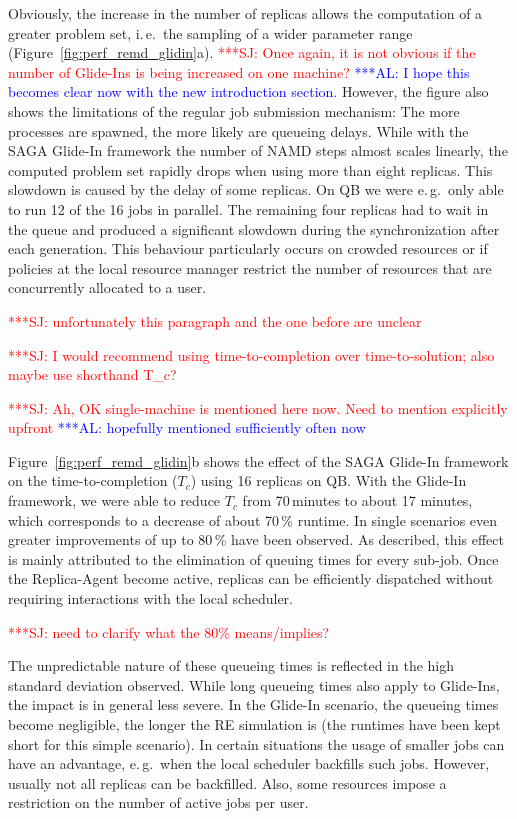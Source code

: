 \documentclass{rspublic}
\newcommand{\alnote}[1]{ {\textcolor{blue} { ***AL: #1 }}}
\newcommand{\jhanote}[1]{ {\textcolor{red} { ***SJ: #1 }}}
\newcommand{\alnote}[1]{}
\newcommand{\jhanote}[1]{}
\begin{document}
Obviously, the increase in the number of replicas allows 
the computation of a greater problem set, i.\,e.\ the sampling of 
a wider parameter range (Figure~\ref{fig:perf_remd_glidin}a).
\jhanote{Once again, it is not obvious if the number of Glide-Ins is
  being increased on one machine?} 
\alnote{I hope this becomes clear now with the new introduction section.} 
However, the figure also shows the limitations of the regular job submission 
mechanism: The more processes are spawned, the more likely are queueing delays. 
While with the SAGA Glide-In framework the number of NAMD steps almost scales
linearly, the computed problem set rapidly drops when using more than
eight replicas. This slowdown is caused by the delay of some replicas. 
On QB we were e.\,g.\ only able to run 12 of the 16 jobs in parallel. 
The remaining four replicas had to wait in the queue and
produced a significant slowdown during the synchronization after each generation.
This behaviour particularly occurs on crowded resources or if policies at the 
local resource manager restrict the number of resources that are concurrently
allocated to a user.

\jhanote{unfortunately this paragraph and the one before are unclear}

\jhanote{I would recommend using time-to-completion over
  time-to-solution; also maybe use shorthand T\_c?}
 
\jhanote{Ah, OK single-machine is mentioned here now. Need to mention
    explicitly upfront}
\alnote{hopefully mentioned sufficiently often now}      

Figure~\ref{fig:perf_remd_glidin}b shows the effect of the SAGA Glide-In framework
on the time-to-completion ($T_{c}$) using 16 replicas on QB. 
With the Glide-In framework, we were able to reduce $T_{c}$ from 70\,minutes
to about 17 minutes, which corresponds to a decrease of about 70\,\% runtime. 
In single scenarios even greater improvements of up to 80\,\% have been 
observed. As described, this effect is mainly attributed to the elimination of 
queuing times for every sub-job. Once the Replica-Agent become active, 
replicas can be efficiently dispatched without requiring interactions 
with the local scheduler. 

\jhanote{need to clarify what the 80\% means/implies?}

The unpredictable nature of these queueing times is reflected in the
high standard deviation observed. While long queueing times 
also apply to Glide-Ins, the impact is in general less severe.
In the Glide-In scenario, the queueing times become
negligible, the longer the RE simulation is (the runtimes have been
kept short for this simple scenario). 
In certain situations the usage of smaller jobs can have an advantage,
e.\,g.\ when the local scheduler backfills such jobs. However, usually
not all replicas can be backfilled. Also, some resources
impose a restriction on the number of active jobs per user. 
\end{document}
